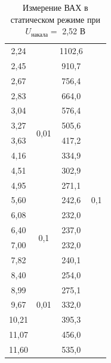 \documentclass[a4paper,12pt]{report}
\begin{document}
\begin{table}[H]
\begin{tabular}{|c|c|c|c|}
2,24  & \multirow{12}{*}{0,01} & 1102,6 & \multirow{21}{*}{0,1} \\ \cline{1-1} \cline{3-3}
2,45  &                        & 910,7  &                       \\ \cline{1-1} \cline{3-3}
2,67  &                        & 756,4  &                       \\ \cline{1-1} \cline{3-3}
2,83  &                        & 664,0  &                       \\ \cline{1-1} \cline{3-3}
3,04  &                        & 576,4  &                       \\ \cline{1-1} \cline{3-3}
3,27  &                        & 505,6  &                       \\ \cline{1-1} \cline{3-3}
3,63  &                        & 417,2  &                       \\ \cline{1-1} \cline{3-3}
4,16  &                        & 334,9  &                       \\ \cline{1-1} \cline{3-3}
4,51  &                        & 302,9  &                       \\ \cline{1-1} \cline{3-3}
4,95  &                        & 271,1  &                       \\ \cline{1-1} \cline{3-3}
5,60  &                        & 242,6  &                       \\ \cline{1-1} \cline{3-3}
6,08  &                        & 232,0  &                       \\ \cline{1-3}
6,40  & \multirow{2}{*}{0,1}   & 237,0  &                       \\ \cline{1-1} \cline{3-3}
7,00  &                        & 232,0  &                       \\ \cline{1-3}
7,82  & \multirow{7}{*}{0,01}  & 240,1  &                       \\ \cline{1-1} \cline{3-3}
8,40  &                        & 254,0  &                       \\ \cline{1-1} \cline{3-3}
8,99  &                        & 275,1  &                       \\ \cline{1-1} \cline{3-3}
9,67  &                        & 332,0  &                       \\ \cline{1-1} \cline{3-3}
10,21 &                        & 395,3  &                       \\ \cline{1-1} \cline{3-3}
11,07 &                        & 456,0  &                       \\ \cline{1-1} \cline{3-3}
11,60 &                        & 535,0  &                       \\ \hline
\end{tabular}
\caption{Измерение ВАХ в статическом режиме при $U_{\text{накала}}=$ 2,52 В}
\end{table}
\end{document}
